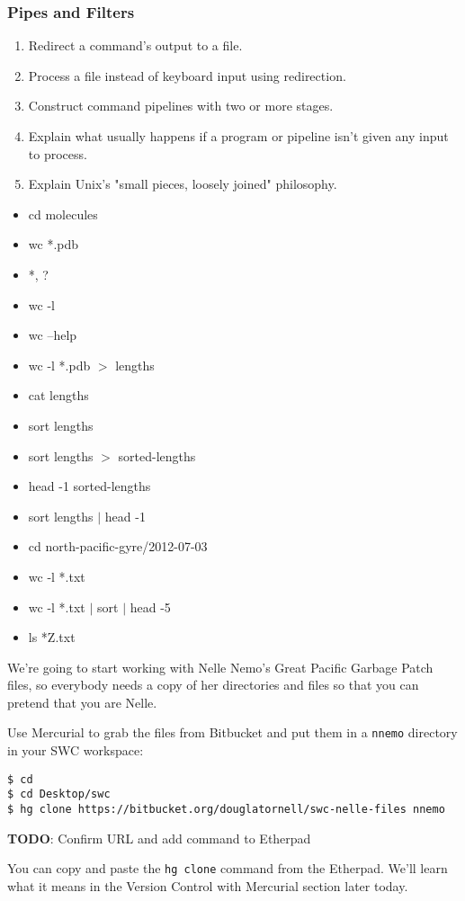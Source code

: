 \documentclass[xcolor=dvipsnames]{beamer}
\begin{document}
\begin{frame}[label=PipesAndFilters]
\frametitle{Pipes and Filters}
\begin{enumerate}

\item    Redirect a command's output to a file.
\item    Process a file instead of keyboard input using redirection.
\item    Construct command pipelines with two or more stages.
\item    Explain what usually happens if a program or pipeline isn't given any input to process.
\item    Explain Unix's "small pieces, loosely joined" philosophy.

\end{enumerate}
\begin{multicols}{2}
\begin{itemize}
\item cd molecules
\item wc *.pdb
\item *, ?
\item wc -l
\item wc --help
\item wc -l *.pdb $>$ lengths
\item cat lengths
\item sort lengths
\item sort lengths $>$ sorted-lengths
\item head -1 sorted-lengths
\item sort lengths $|$ head -1
\item cd north-pacific-gyre/2012-07-03
\item wc -l *.txt
\item wc -l *.txt $|$ sort $|$ head -5
\item ls *Z.txt
\end{itemize}
\end{multicols}
\end{frame}


\begin{frame}[fragile]
We're going to start working with Nelle Nemo's Great Pacific Garbage Patch files,
so everybody needs a copy of her directories and files so that you can pretend that you are Nelle.

Use Mercurial to grab the files from Bitbucket and put them in a {\tt nnemo} directory in your SWC workspace:
{\footnotesize
\begin{verbatim}
$ cd
$ cd Desktop/swc
$ hg clone https://bitbucket.org/douglatornell/swc-nelle-files nnemo
\end{verbatim}
}
{\bf TODO}: Confirm URL and add command to Etherpad

You can copy and paste the {\tt hg clone} command from the Etherpad.
We'll learn what it means in the Version Control with Mercurial section later today.
\end{frame}
\end{document}
